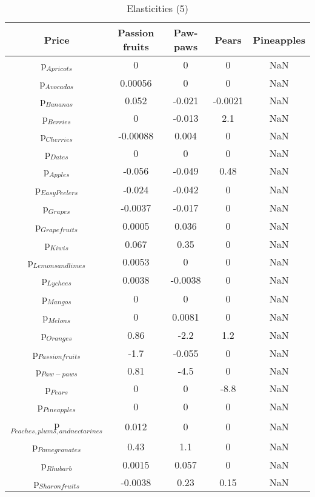 \documentclass[11pt]{article}
\begin{document}
\begin{table}[h]
\caption{Elasticities (5)}
\label{Table: elasticities 5}
\begin{center}
\begin{tabular}{ccccc}
Price & Passion fruits & Paw-paws & Pears & Pineapples \\ \hline
p$_{Apricots}$ & 0 & 0 & 0 & NaN \\ 
p$_{Avocados}$ & 0.00056 & 0 & 0 & NaN \\ 
p$_{Bananas}$ & 0.052 & -0.021 & -0.0021 & NaN \\ 
p$_{Berries}$ & 0 & -0.013 & 2.1 & NaN \\ 
p$_{Cherries}$ & -0.00088 & 0.004 & 0 & NaN \\ 
p$_{Dates}$ & 0 & 0 & 0 & NaN \\ 
p$_{Apples}$ & -0.056 & -0.049 & 0.48 & NaN \\ 
p$_{Easy Peelers}$ & -0.024 & -0.042 & 0 & NaN \\ 
p$_{Grapes}$ & -0.0037 & -0.017 & 0 & NaN \\ 
p$_{Grapefruits}$ & 0.0005 & 0.036 & 0 & NaN \\ 
p$_{Kiwis}$ & 0.067 & 0.35 & 0 & NaN \\ 
p$_{Lemons and limes}$ & 0.0053 & 0 & 0 & NaN \\ 
p$_{Lychees}$ & 0.0038 & -0.0038 & 0 & NaN \\ 
p$_{Mangos}$ & 0 & 0 & 0 & NaN \\ 
p$_{Melons}$ & 0 & 0.0081 & 0 & NaN \\ 
p$_{Oranges}$ & 0.86 & -2.2 & 1.2 & NaN \\ 
p$_{Passion fruits}$ & -1.7 & -0.055 & 0 & NaN \\ 
p$_{Paw-paws}$ & 0.81 & -4.5 & 0 & NaN \\ 
p$_{Pears}$ & 0 & 0 & -8.8 & NaN \\ 
p$_{Pineapples}$ & 0 & 0 & 0 & NaN \\ 
p$_{Peaches, plums, and nectarines}$ & 0.012 & 0 & 0 & NaN \\ 
p$_{Pomegranates}$ & 0.43 & 1.1 & 0 & NaN \\ 
p$_{Rhubarb}$ & 0.0015 & 0.057 & 0 & NaN \\ 
p$_{Sharon fruits}$ & -0.0038 & 0.23 & 0.15 & NaN \\ 
\end{tabular}
\end{center}
\end{table}
\end{document}

